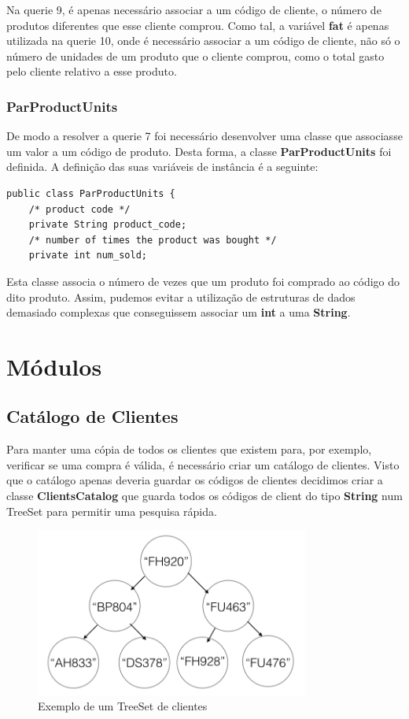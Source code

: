 \documentclass[10pt] {article}
\begin{document}
Na querie 9, é apenas necessário associar a um código de cliente, o número de produtos diferentes que esse cliente
comprou. Como tal, a variável \textbf{fat} é apenas utilizada na querie 10, onde é necessário associar a um código de
cliente, não só o número de unidades de um produto que o cliente comprou, como o total gasto pelo cliente relativo a esse
produto.

\subsubsection{ParProductUnits}

De modo a resolver a querie 7 foi necessário desenvolver uma classe que associasse um valor a um código de produto.
Desta forma, a classe \textbf{ParProductUnits} foi definida. A definição das suas variáveis de instância é a seguinte:

\begin{lstlisting}
public class ParProductUnits {
	/* product code */
    private String product_code;
    /* number of times the product was bought */
    private int num_sold;
\end{lstlisting}


Esta classe associa o número de vezes que um produto foi comprado ao código do dito produto. Assim, pudemos evitar
a utilização de estruturas de dados demasiado complexas que conseguissem associar um \textbf{int} a uma \textbf{String}.

\newpage
\section{Módulos}
\subsection{Catálogo de Clientes}

Para manter uma cópia de todos os clientes que existem para, por exemplo, verificar se uma compra é válida, é necessário
criar um catálogo de clientes. Visto que o catálogo apenas deveria guardar os códigos de clientes decidimos criar a classe
\textbf{ClientsCatalog} que guarda todos os códigos de client do tipo \textbf{String} num TreeSet para permitir uma pesquisa
rápida.

\begin{figure}[ht!]
\centering
\includegraphics[width=90mm]{catclientes.png}
\caption{Exemplo de um TreeSet de clientes}
\end{figure}
\end{document}
